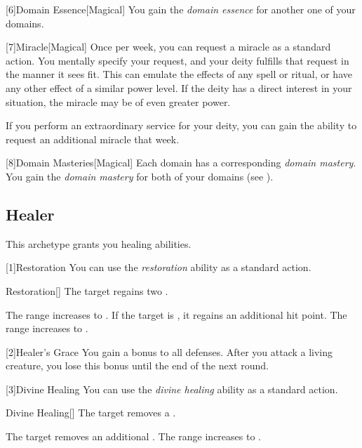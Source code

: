         [6]{Domain Essence}[Magical]
        You gain the \textit{domain essence} for another one of your domains.

        [7]{Miracle}[Magical]
        Once per week, you can request a miracle as a standard action.
        You mentally specify your request, and your deity fulfills that request in the manner it sees fit.
        This can emulate the effects of any spell or ritual, or have any other effect of a similar power level.
        If the deity has a direct interest in your situation, the miracle may be of even greater power.

        If you perform an extraordinary service for your deity, you can gain the ability to request an additional miracle that week.

        [8]{Domain Masteries}[Magical]
        Each domain has a corresponding \textit{domain mastery}.
        You gain the \textit{domain mastery} for both of your domains (see ).

    \subsection{Healer}
        This archetype grants you healing abilities.

        [1]{Restoration} You can use the \textit{restoration} ability as a standard action.
        \begin{freeability}{Restoration}[]
            The target regains two .

            \rankline
             The range increases to \rngclose.
             If the target is , it regains an additional hit point.
             The range increases to \rngmed.
        \end{freeability}

        [2]{Healer's Grace} You gain a  bonus to all defenses.
        After you attack a living creature, you lose this bonus until the end of the next round.

        [3]{Divine Healing} You can use the \textit{divine healing} ability as a standard action.
        \begin{apability}{Divine Healing}[]
            The target removes a .

            \rankline
             The target removes an additional .
             The range increases to \rnglong.
        \end{apability}

